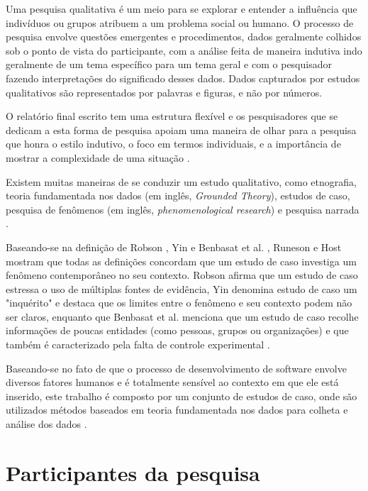 Uma pesquisa qualitativa é um meio para se explorar e entender a influência que 
indivíduos ou grupos atribuem a um problema social ou humano. O processo de
pesquisa envolve questões emergentes e procedimentos, dados geralmente colhidos
sob o ponto de vista do participante, com a análise feita de maneira indutiva
indo  geralmente de um tema específico para um tema geral e com o pesquisador
fazendo interpretações do significado desses dados. Dados capturados por estudos
qualitativos são representados por palavras e figuras, e não por números.

O relatório final escrito tem uma estrutura flexível e os pesquisadores que se
dedicam a esta forma de pesquisa apoiam uma maneira de olhar para a pesquisa que
honra o estilo indutivo, o foco em termos individuais, e a importância de mostrar a 
complexidade de uma situação \cite{creswell}. 

Existem muitas maneiras de se conduzir um estudo qualitativo, como etnografia,
teoria fundamentada nos dados (em inglês, \textit{Grounded Theory}), estudos de 
caso, pesquisa de fenômenos (em inglês, \textit{phenomenological research}) e 
pesquisa narrada \cite{creswell}. 

Baseando-se na definição de Robson \cite{robson}, Yin \cite{yin} e Benbasat et
al. \cite{benbasat}, Runeson e Host mostram que todas as definições concordam
que um estudo de caso investiga um fenômeno contemporâneo no seu contexto. 
Robson afirma que um estudo de caso estressa o uso de múltiplas fontes de
evidência, Yin denomina estudo de caso um "inquérito" e destaca que os limites 
entre o fenômeno e seu contexto podem não ser claros, enquanto que Benbasat et
al. menciona que um estudo de caso recolhe informações de poucas entidades 
(como pessoas, grupos ou organizações) e que também é caracterizado pela  falta
de controle experimental \cite{guidelines-case-study}.

Baseando-se no fato de que o processo de desenvolvimento de software envolve 
diversos fatores humanos e é totalmente sensível ao contexto em que ele está 
inserido, este trabalho é composto por um conjunto de estudos de caso, onde são 
utilizados métodos baseados em teoria fundamentada nos dados para colheta e
análise dos dados \cite{grounded-theory}.

\section{Participantes da pesquisa}
\label{sec:planejamento-participantes}

